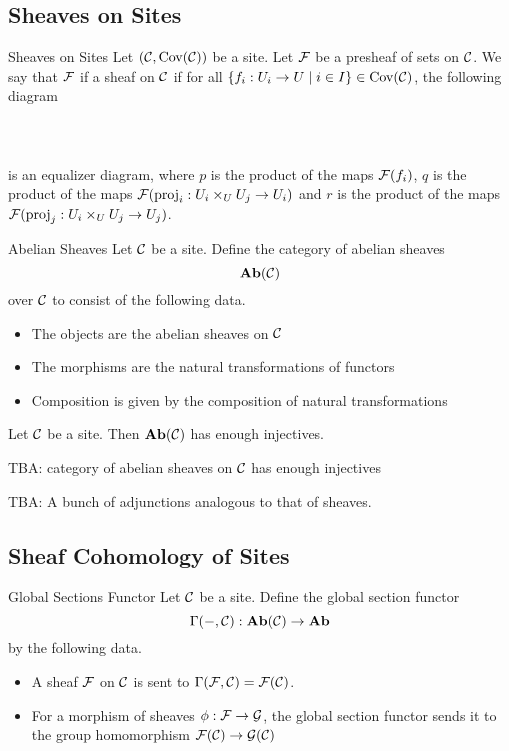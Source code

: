 \documentclass[a4paper]{article}
\begin{document}
\subsection{Sheaves on Sites}
\begin{defn}{Sheaves on Sites}{} Let $(\mathcal{C},\text{Cov}(\mathcal{C}))$ be a site. Let $\mathcal{F}$ be a presheaf of sets on $\mathcal{C}$. We say that $\mathcal{F}$ if a sheaf on $\mathcal{C}$ if for all $\{f_i:U_i\to U\;|\;i\in I\}\in\text{Cov}(\mathcal{C})$, the following diagram \\~\\
\\~\\
is an equalizer diagram, where $p$ is the product of the maps $\mathcal{F}(f_i)$, $q$ is the product of the maps $\mathcal{F}(\text{proj}_i:U_i\times_UU_j\to U_i)$ and $r$ is the product of the maps $\mathcal{F}(\text{proj}_j:U_i\times_UU_j\to U_j)$. 
\end{defn}

\begin{defn}{Abelian Sheaves}{} Let $\mathcal{C}$ be a site. Define the category of abelian sheaves $$\bold{Ab}(\mathcal{C})$$ over $\mathcal{C}$ to consist of the following data. 
\begin{itemize}
\item The objects are the abelian sheaves on $\mathcal{C}$
\item The morphisms are the natural transformations of functors
\item Composition is given by the composition of natural transformations
\end{itemize}
\end{defn}

\begin{thm}{}{} Let $\mathcal{C}$ be a site. Then $\bold{Ab}(\mathcal{C})$ has enough injectives. 
\end{thm}

TBA: category of abelian sheaves on $\mathcal{C}$ has enough injectives

TBA: A bunch of adjunctions analogous to that of sheaves. 

\subsection{Sheaf Cohomology of Sites}
\begin{defn}{Global Sections Functor}{} Let $\mathcal{C}$ be a site. Define the global section functor $$\Gamma(-,\mathcal{C}):\bold{Ab}(\mathcal{C})\to\bold{Ab}$$ by the following data. 
\begin{itemize}
\item A sheaf $\mathcal{F}$ on $\mathcal{C}$ is sent to $\Gamma(\mathcal{F},\mathcal{C})=\mathcal{F}(\mathcal{C})$. 
\item For a morphism of sheaves $\phi:\mathcal{F}\to\mathcal{G}$, the global section functor sends it to the group homomorphism $\mathcal{F}(\mathcal{C})\to\mathcal{G}(\mathcal{C})$
\end{itemize}
\end{defn}
\end{document}
